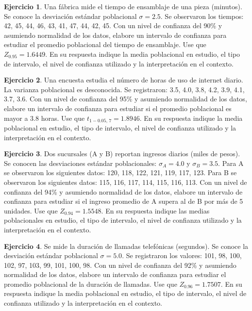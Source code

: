 \documentclass[
  11pt,
]{book}
\theoremstyle{definition}
\theoremstyle{definition}
\theoremstyle{definition}
\newtheorem{exercise}{Ejercicio}[chapter]
\theoremstyle{definition}
\theoremstyle{remark}
\begin{document}
\begin{exercise}
Una fábrica mide el tiempo de ensamblaje de una pieza (minutos). Se conoce la desviación estándar poblacional \(\sigma = 2.5\). Se observaron los tiempos: 42, 45, 44, 46, 43, 41, 47, 44, 42, 45. Con un nivel de confianza del 90\% y asumiendo normalidad de los datos, elabore un intervalo de confianza para estudiar el promedio poblacional del tiempo de ensamblaje. Use que \(Z_{0.95} = 1.6449\). En su respuesta indique la media poblacional en estudio, el tipo de intervalo, el nivel de confianza utilizado y la interpretación en el contexto.
\end{exercise}

\begin{exercise}
Una encuesta estudia el número de horas de uso de internet diario. La varianza poblacional es desconocida. Se registraron: 3.5, 4.0, 3.8, 4.2, 3.9, 4.1, 3.7, 3.6. Con un nivel de confianza del 95\% y asumiendo normalidad de los datos, elabore un intervalo de confianza para estudiar si el promedio poblacional es mayor a 3.8 horas. Use que \(t_{1-0.05,\,7} = 1.8946\). En su respuesta indique la media poblacional en estudio, el tipo de intervalo, el nivel de confianza utilizado y la interpretación en el contexto.
\end{exercise}

\begin{exercise}
Dos sucursales (A y B) reportan ingresos diarios (miles de pesos). Se conocen las desviaciones estándar poblacionales: \(\sigma_A = 4.0\) y \(\sigma_B = 3.5\). Para A se observaron los siguientes datos: 120, 118, 122, 121, 119, 117, 123. Para B se observaron los siguientes datos: 115, 116, 117, 114, 115, 116, 113. Con un nivel de confianza del 94\% y asumiendo normalidad de los datos, elabore un intervalo de confianza para estudiar si el ingreso promedio de A supera al de B por más de 5 unidades. Use que \(Z_{0.94} = 1.5548\). En su respuesta indique las medias poblacionales en estudio, el tipo de intervalo, el nivel de confianza utilizado y la interpretación en el contexto.
\end{exercise}

\begin{exercise}
Se mide la duración de llamadas telefónicas (segundos). Se conoce la desviación estándar poblacional \(\sigma = 5.0\). Se registraron los valores: 101, 98, 100, 102, 97, 103, 99, 101, 100, 98. Con un nivel de confianza del 92\% y asumiendo normalidad de los datos, elabore un intervalo de confianza para estudiar el promedio poblacional de la duración de llamadas. Use que \(Z_{0.96} = 1.7507\). En su respuesta indique la media poblacional en estudio, el tipo de intervalo, el nivel de confianza utilizado y la interpretación en el contexto.
\end{exercise}
\end{document}
